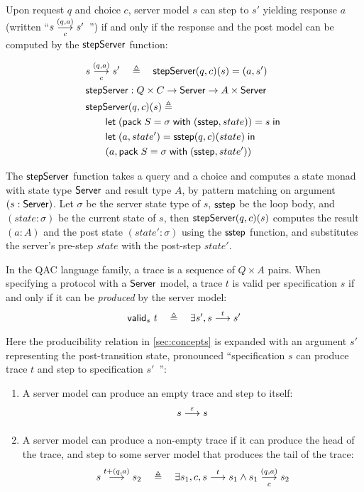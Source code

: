 \begin{definition}
  \label{def:server-step}
  Upon request $q$ and choice $c$, server model $s$ can step to $s'$ yielding
  response $a$ (written ``$\triggers sc{(q,a)}s'$~'') if and only if the
  response and the post model can be computed by the $\mathsf{stepServer}$ function:

\begin{align*}
  &\triggers sc{(q,a)}s'\quad\triangleq\quad\stepServer(q,c)(s)=(a,s')\\
  &\stepServer:Q\times C \to \Server \to A\times \Server \\
  &\stepServer(q,c)(s)\triangleq\\
  &\qquad\letin{(\existT{S}{\sigma}{(\sstep, state)})}{s}\\
  &\qquad\letin{(a,state')}{\sstep(q,c)(state)} \\
  &\qquad(a, \existT{S}{\sigma}{(\sstep, state')})
\end{align*}

The $\mathsf{stepServer}$ function takes a query and a choice and computes a state monad
with state type $\mathsf{Server}$ and result type $A$, by pattern matching on argument
$(s:\mathsf{Server})$.  Let $\sigma$ be the server state type of $s$, $\mathsf{sstep}$ be the
loop body, and $(state:\sigma)$ be the current state of $s$, then
$\mathsf{stepServer}(q,c)(s)$ computes the result $(a:A)$ and the post state
$(state':\sigma)$ using the $\mathsf{sstep}$ function, and substitutes the server's
pre-step $state$ with the post-step $state'$.
\end{definition}

\begin{definition}
  \label{def:trace-validity}
  In the QAC language family, a trace is a sequence of $Q\times A$ pairs.  When
  specifying a protocol with a $\mathsf{Server}$ model, a trace $t$ is valid per
  specification $s$ if and only if it can be {\em produced} by the server model:
  \[\valid s t\quad\triangleq\quad\exists s',\behaves s t s'\]
  Here the producibility relation in \autoref{sec:concepts} is expanded with an
  argument $s'$ representing the post-transition state, pronounced
  ``specification $s$ can produce trace $t$ and step to specification $s'$~'':
  \begin{enumerate}
  \item A server model can produce an empty trace and step to itself:
    \[\behaves s \nil s\]
  \item A server model can produce a non-empty trace if it can produce the head
    of the trace, and step to some server model that produces the tail of the
    trace:
    \[\behaves s {t+(q,a)} s_2\quad\triangleq\quad\exists s_1,c,\behaves s t s_1\wedge\triggers {s_1}c{(q,a)}s_2\]
  \end{enumerate}
\end{definition}

